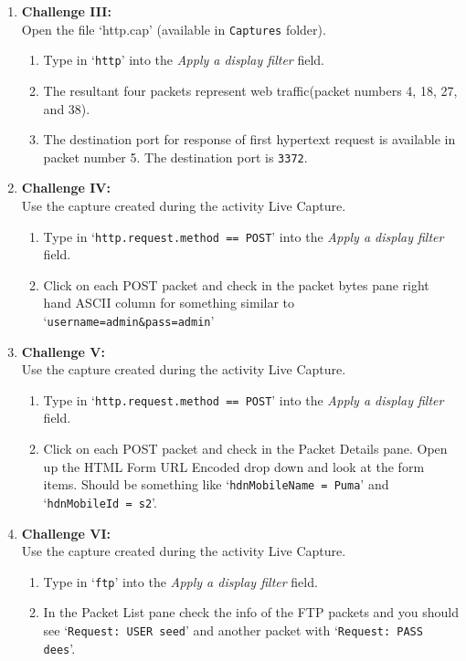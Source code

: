 \documentclass[12pt]{extarticle}
\newcommand{\ben}{\begin{enumerate}}
\newcommand{\een}{\end{enumerate}}
\begin{document}
\begin{enumerate}
			\vspace{4mm}
			\item \textbf{Challenge III:}\\
			Open the file `http.cap' (available in \texttt{Captures} folder).
			\ben
				\item Type in `\texttt{http}' into the {\textit{Apply a display filter}} field.
				\item The resultant four packets represent web traffic(packet numbers 4, 18, 27, and 38).
				\item The destination port for response of first hypertext request is available in packet number 5. The destination port is \texttt{3372}. 
			\een
			
			\vspace{4mm}
			\item \textbf{Challenge IV:}\\
			Use the capture created during the activity Live Capture.
			\ben
				\item Type in `\texttt{http.request.method == POST}' into the {\textit{Apply a display filter}} field.
				\item Click on each POST packet and check in the packet bytes pane right hand ASCII column for something similar to `\texttt{username=admin\&pass=admin}'
			\een
			
			\vspace{4mm}
			\item \textbf{Challenge V:}\\
			Use the capture created during the activity Live Capture.
			\ben
				\item Type in `\texttt{http.request.method == POST}' into the {\textit{Apply a display filter}} field.
				\item Click on each POST packet and check in the Packet Details pane. Open up the HTML Form URL Encoded drop down and look at the form items. Should be something like `\texttt{hdnMobileName = Puma}' and `\texttt{hdnMobileId = s2}'.
			\een
			
			\vspace{4mm}
			\item \textbf{Challenge VI:}\\
			Use the capture created during the activity Live Capture.
			\ben
				\item Type in `\texttt{ftp}' into the {\textit{Apply a display filter}} field.
				\item In the Packet List pane check the info of the FTP packets and you should see `\texttt{Request: USER seed}' and another packet with `\texttt{Request: PASS dees}'.
			\een
			

\end{enumerate}
\end{document}
